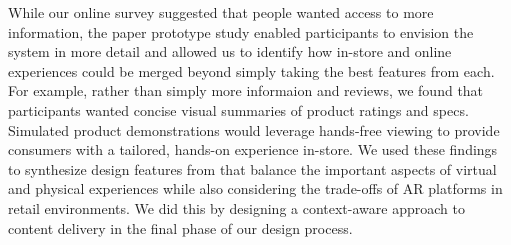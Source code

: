 While our online survey suggested that people wanted access to more information, the paper prototype study enabled participants to envision the system in more detail and allowed us to identify how in-store and online experiences could be merged beyond simply taking the best features from each. For example, rather than simply more informaion and reviews, we found that participants wanted concise visual summaries of product ratings and specs. Simulated product demonstrations would leverage hands-free viewing to provide consumers with a tailored, hands-on experience in-store. 
We used these findings to 
synthesize design features from that balance the important aspects of virtual and physical experiences while also considering the trade-offs of AR platforms in retail environments. 
We did this by designing a context-aware approach to content delivery in the final phase of our design process. 
